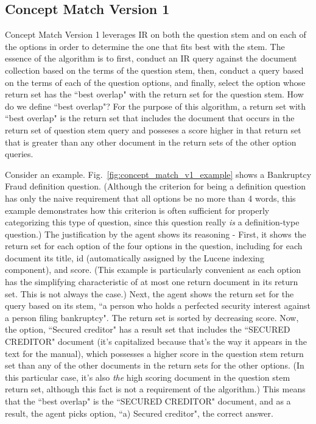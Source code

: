 \subsection{Concept Match Version 1}

Concept Match Version 1 leverages IR on both the question stem and on each of the options in order to determine the one that fits best with the stem.  The essence of the algorithm is to first, conduct an IR query against the document collection based on the terms of the question stem, then, conduct a query based on the terms of each of the question options, and finally, select the option whose return set has the ``best overlap" with the return set for the question stem.  How do we define ``best overlap"?  For the purpose of this algorithm, a return set with ``best overlap" is the return set that includes the document that occurs in the return set of question stem query and posseses a score higher in that return set that is greater than any other document in the return sets of the other option queries.

Consider an example.  Fig.~\ref{fig:concept_match_v1_example} shows a Bankruptcy Fraud definition question.  (Although the criterion for being a definition question has only the naive requirement that all options be no more than 4 words, this example demonstrates how this criterion is often sufficient for properly categorizing this type of question, since this question really \emph{is} a definition-type question.)  The justification by the agent shows its reasoning - First, it shows the return set for each option of the four options in the question, including for each document its title, id (automatically assigned by the Lucene indexing component), and score.  (This example is particularly convenient as each option has the simplifying characteristic of at most one return document in its return set.  This is not always the case.)  Next, the agent shows the return set for the query based on its stem, ``a person who holds a perfected security interest against a person filing bankruptcy".  The return set is sorted by decreasing score.  Now, the option, ``Secured creditor" has a result set that includes the ``SECURED CREDITOR" document (it's capitalized because that's the way it appears in the text for the manual), which possesses a higher score in the question stem return set than any of the other documents in the return sets for the other options.  (In this particular case, it's also \emph{the} high scoring document in the question stem return set, although this fact is not a requirement of the algorithm.)  This means that the ``best overlap" is the ``SECURED CREDITOR" document, and as a result, the agent picks option, ``a) Secured creditor", the correct answer.

